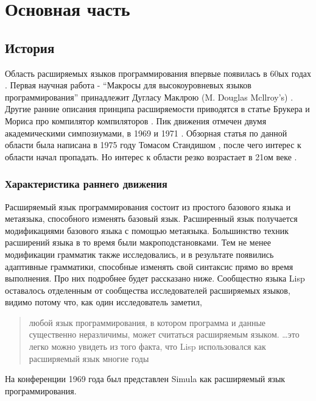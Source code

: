 \documentclass[a4paper,12pt]{article}
\begin{document}
\section{Основная часть}

\subsection{История}
Область расширяемых языков программирования впервые появилась в 60ых годах
\cite{hist69}. Первая научная работа - ``Макросы для высокоуровневых языков
программирования'' принадлежит Дугласу Маклрою (M. Douglas Mcllroy's)
\cite{macro60}. Другие ранние описания принципа расширяемости приводятся в
статье Брукера и Мориса про компилятор компиляторов \cite{cc60}.
Пик движения отмечен двумя академическими симпозиумами, в 1969 \cite{proc69} и 1971
\cite{proc71}. Обзорная статья по данной области была написана в 1975 году
Томасом Стандишом \cite{Stan75}, после чего интерес к области начал пропадать.
Но интерес к области резко возрастает в 21ом веке \cite{Ext2105}.

\subsubsection{Характеристика раннего движения}

Расширяемый язык программирования состоит из простого базового языка и
метаязыка, способного изменять базовый язык. Расширенный язык получается
модификациями базового языка с помощью метаязыка. Большинство техник расширений
языка в то время были макроподстановками. Тем не менее модификации грамматик 
также исследовались, и в результате появились адаптивные грамматики, способные
изменять свой синтаксис прямо во время выполнения. Про них подробнее будет 
рассказано ниже. Сообщестно языка Lisp оставалось отделенным от сообщества
исследователей расширяемых языков, видимо потому что, как один исследователь
заметил, \cite{harr60}
\begin{quote}
любой язык программирования, в котором программа и данные существенно
неразличимы, может считаться расширяемым языком. \ldots это легко можно увидеть
из того факта, что Lisp использовался как расширяемый язык многие годы
\end{quote}
На конференции 1969 года был представлен Simula как расширяемый язык
программирования.
\end{document}
